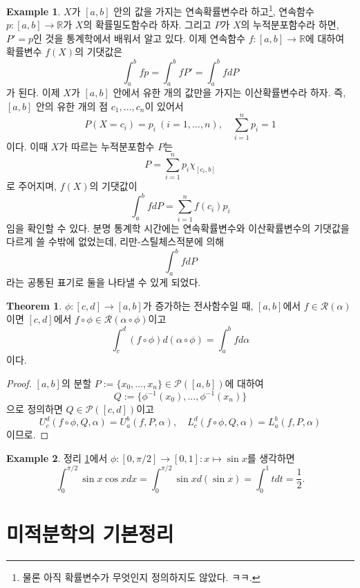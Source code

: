 \documentclass[11pt]{book}
\numberwithin{equation}{chapter}
\def\RR{\mathbb{R}}
\def\calP{\mathcal{P}}
\def\calR{\mathcal{R}}
\theoremstyle{definition}
\newtheorem{thm}{Theorem}[section]
\newtheorem*{ex}{Example}
\begin{document}
\begin{ex}
    \(X\)가 \([a, b]\) 안의 값을 가지는 연속확률변수라 하고\footnote{물론 아직 확률변수가 무엇인지 정의하지도 않았다. ㅋㅋ.}, 연속함수 \(p : [a, b] \to \RR\)가 \(X\)의 확률밀도함수라 하자. 그리고 \(P\)가 \(X\)의 누적분포함수라 하면, \(P' = p\)인 것을 통계학에서 배워서 알고 있다. 이제 연속함수 \(f : [a, b] \to \RR\)에 대하여 확률변수 \(f(X)\)의 기댓값은
    \[
        \int_a^b fp = \int_a^b fP' = \int_a^b fdP
    \]
    가 된다. 이제 \(X\)가 \([a, b]\) 안에서 유한 개의 값만을 가지는 이산확률변수라 하자. 즉, \([a, b]\) 안의 유한 개의 점 \(c_1, \ldots, c_n\)이 있어서
    \[
        P(X = c_i) = p_i \ (i = 1, \ldots, n), \quad \sum_{i=1}^n p_i = 1
    \]
    이다. 이때 \(X\)가 따르는 누적분포함수 \(P\)는
    \[
        P = \sum_{i=1}^n p_i \chi_{[c_i, b]}
    \]
    로 주어지며, \(f(X)\)의 기댓값이
    \[
        \int_a^b f dP = \sum_{i=1}^n f(c_i)p_i
    \]
    임을 확인할 수 있다. 분명 통계학 시간에는 연속확률변수와 이산확률변수의 기댓값을 다르게 쓸 수밖에 없었는데, 리만-스틸체스적분에 의해
    \[
        \int_a^b f dP
    \]
    라는 공통된 표기로 둘을 나타낼 수 있게 되었다.
\end{ex}

\begin{thm} \label{9.3.12}
    \(\phi : [c, d] \to [a, b]\)가 증가하는 전사함수일 때, \([a, b]\)에서 \(f \in \calR(\alpha)\)이면 \([c, d]\)에서 \(f \circ \phi \in \calR(\alpha \circ \phi)\)이고
    \[
        \int_c^d (f \circ \phi)d(\alpha \circ \phi) = \int_a^b f d\alpha
    \]
    이다.
\end{thm}
\begin{proof}
    \([a, b]\)의 분할 \(P := \{x_0, \ldots, x_n\} \in \calP([a, b])\)에 대하여
    \[
        Q := \{\phi^{-1}(x_0), \ldots, \phi^{-1}(x_n)\}
    \]
    으로 정의하면 \(Q \in \calP([c, d])\)이고
    \[
        U_c^d(f \circ \phi, Q, \alpha) = U_a^b(f, P, \alpha), \quad L_c^d(f \circ \phi, Q, \alpha) = L_a^b(f, P, \alpha)
    \]
    이므로.
\end{proof}

\begin{ex}
    정리 \ref{9.3.12}에서 \(\phi : [0, \pi/2] \to [0, 1] : x \mapsto \sin x\)를 생각하면
    \[
        \int_0^{\pi/2} \sin x \cos x dx = \int_0^{\pi /2} \sin x d(\sin x) = \int_0^1 t dt = \frac{1}{2}.
    \]
\end{ex}

\section{미적분학의 기본정리}
\end{document}
